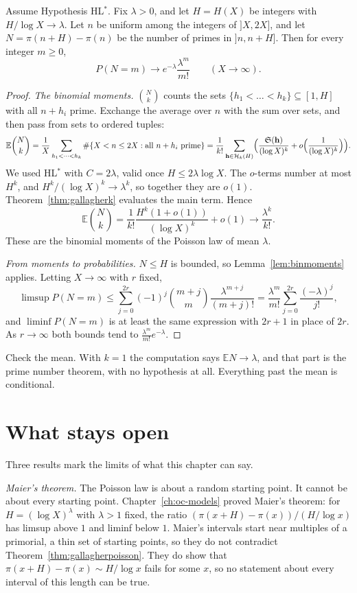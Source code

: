 \begin{theorem}[Gallagher, 1976]\label{thm:gallagherpoisson}
Assume Hypothesis HL$^*$. Fix $\lambda>0$, and let $H=H(X)$ be integers with $H/\log X\to\lambda$. Let $n$ be uniform among the integers of $]X,2X]$, and let $N=\pi(n+H)-\pi(n)$ be the number of primes in $]n,n+H]$. Then for every integer $m\ge0$,
\[
P(N=m)\longrightarrow e^{-\lambda}\frac{\lambda^m}{m!}\qquad(X\to\infty).
\]
\end{theorem}
\begin{proof}
\emph{The binomial moments.} $\binom Nk$ counts the sets $\{h_1<\dots<h_k\}\subseteq[1,H]$ with all $n+h_i$ prime. Exchange the average over $n$ with the sum over sets, and then pass from sets to ordered tuples:
\[
\mathbb E\binom Nk=\frac1X\sum_{h_1<\dots<h_k}\#\{X<n\le2X:\text{all }n+h_i\text{ prime}\}=\frac1{k!}\sum_{\mathbf h\in\mathcal H_k(H)}\Bigl(\frac{\mathfrak S(\mathbf h)}{(\log X)^k}+o\Bigl(\frac1{(\log X)^k}\Bigr)\Bigr).
\]
We used HL$^*$ with $C=2\lambda$, valid once $H\le2\lambda\log X$. The $o$-terms number at most $H^k$, and $H^k/(\log X)^k\to\lambda^k$, so together they are $o(1)$. Theorem~\ref{thm:gallagherk} evaluates the main term. Hence
\[
\mathbb E\binom Nk=\frac1{k!}\frac{H^k(1+o(1))}{(\log X)^k}+o(1)\longrightarrow\frac{\lambda^k}{k!}.
\]
These are the binomial moments of the Poisson law of mean $\lambda$.

\emph{From moments to probabilities.} $N\le H$ is bounded, so Lemma~\ref{lem:binmoments} applies. Letting $X\to\infty$ with $r$ fixed,
\[
\limsup P(N=m)\le\sum_{j=0}^{2r}(-1)^j\binom{m+j}m\frac{\lambda^{m+j}}{(m+j)!}=\frac{\lambda^m}{m!}\sum_{j=0}^{2r}\frac{(-\lambda)^j}{j!},
\]
and $\liminf P(N=m)$ is at least the same expression with $2r+1$ in place of $2r$. As $r\to\infty$ both bounds tend to $\frac{\lambda^m}{m!}e^{-\lambda}$.
\end{proof}

Check the mean. With $k=1$ the computation says $\mathbb E N\to\lambda$, and that part is the prime number theorem, with no hypothesis at all. Everything past the mean is conditional.

\section{What stays open}

Three results mark the limits of what this chapter can say.

\emph{Maier's theorem.} The Poisson law is about a random starting point. It cannot be about every starting point. Chapter~\ref{ch:oc-models} proved Maier's theorem: for $H=(\log X)^\lambda$ with $\lambda>1$ fixed, the ratio $(\pi(x+H)-\pi(x))/(H/\log x)$ has limsup above $1$ and liminf below $1$. Maier's intervals start near multiples of a primorial, a thin set of starting points, so they do not contradict Theorem~\ref{thm:gallagherpoisson}. They do show that $\pi(x+H)-\pi(x)\sim H/\log x$ fails for some $x$, so no statement about every interval of this length can be true.

